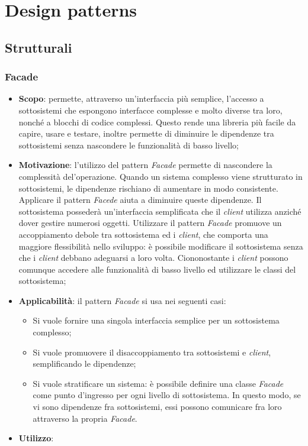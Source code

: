 \newpage
\section{Design patterns}
\subsection{Strutturali}
\subsubsection{Facade}
\begin{itemize}
\item \textbf{Scopo}: permette, attraverso un'interfaccia più semplice, l'accesso a sottosistemi che espongono interfacce complesse e molto diverse tra loro, nonché a blocchi di codice complessi. Questo rende una libreria più facile da capire, usare e testare, inoltre permette di diminuire le dipendenze tra sottosistemi senza nascondere le funzionalità di basso livello;

\item \textbf{Motivazione}: l'utilizzo del pattern \textit{Facade} permette di nascondere la complessità del'operazione. Quando un sistema complesso viene strutturato in sottosistemi, le dipendenze rischiano di aumentare in modo consistente. Applicare il pattern \textit{Facede} aiuta a diminuire queste dipendenze. Il sottosistema possederà un'interfaccia semplificata che il \textit{client} utilizza anziché dover gestire numerosi oggetti. Utilizzare il pattern \textit{Facade} promuove un accoppiamento debole tra sottosistema ed i \textit{client}, che comporta una maggiore flessibilità nello sviluppo: è possibile modificare il sottosistema senza che i \textit{client} debbano adeguarsi a loro volta. Ciononostante i \textit{client} possono comunque accedere alle funzionalità di basso livello ed utilizzare le classi del sottosistema;

\item \textbf{Applicabilità}: il pattern \textit{Facade} si usa nei seguenti casi:
	\begin{itemize}
		\item Si vuole fornire una singola interfaccia semplice per un sottosistema complesso;
		\item Si vuole promuovere il disaccoppiamento tra sottosistemi e \textit{client}, semplificando le dipendenze;
		\item Si vuole stratificare un sistema: è possibile definire una classe \textit{Facade} come punto d'ingresso per ogni livello di sottosistema. In questo modo, se vi sono dipendenze fra sottosistemi, essi possono comunicare fra loro attraverso la propria \textit{Facade}.
	\end{itemize}
	
\item \textbf{Utilizzo}:
\end{itemize}

